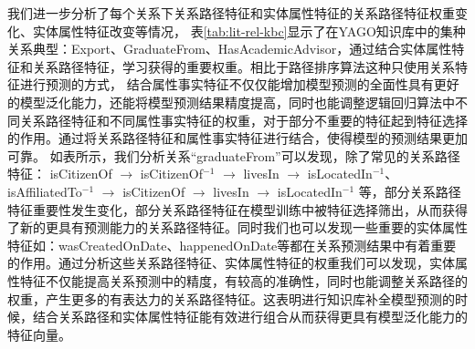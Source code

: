 我们进一步分析了每个关系下关系路径特征和实体属性特征的关系路径特征权重变化、实体属性特征改变等情况，
表\ref{tab:lit-rel-kbc}显示了在YAGO知识库中的集种关系典型：Export、GraduateFrom、HasAcademicAdvisor，通过结合实体属性特征和关系路径特征，学习获得的重要权重。相比于路径排序算法这种只使用关系特征进行预测的方式，
结合属性事实特征不仅仅能增加模型预测的全面性具有更好的模型泛化能力，还能将模型预测结果精度提高，同时也能调整逻辑回归算法中不同关系路径特征和不同属性事实特征的权重，对于部分不重要的特征起到特征选择的作用。通过将关系路径特征和属性事实特征进行结合，使得模型的预测结果更加可靠。
如表所示，我们分析关系“graduateFrom”可以发现，除了常见的关系路径特征：
isCitizenOf $\to$ isCitizenOf$^{-1}$ $\to$ livesIn $\to$ isLocatedIn$^{-1}$、
isAffiliatedTo$^{-1}$ $\to$ isCitizenOf $\to$ livesIn $\to$ isLocatedIn$^{-1}$
等，部分关系路径特征重要性发生变化，部分关系路径特征在模型训练中被特征选择筛出，从而获得了新的更具有预测能力的关系路径特征。同时我们也可以发现一些重要的实体属性特征如：wasCreatedOnDate、happenedOnDate等都在关系预测结果中有着重要的作用。通过分析这些关系路径特征、实体属性特征的权重我们可以发现，实体属性特征不仅能提高关系预测中的精度，有较高的准确性，同时也能调整关系路径的权重，产生更多的有表达力的关系路径特征。这表明进行知识库补全模型预测的时候，结合关系路径和实体属性特征能有效进行组合从而获得更具有模型泛化能力的特征向量。

